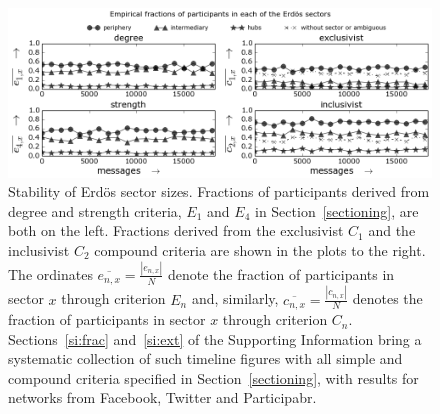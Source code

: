 \documentclass[%
	aip,
	jmp,%
	amsmath,amssymb,
	reprint,%
]{revtex4-1}
\begin{document}
																																																																																		\begin{figure} 
																																																																																			\centering
																																																																																			\includegraphics[width=\textwidth]{figs/InText-WLAU-S1000_}
																																																																																			\caption{Stability of Erd\"os sector sizes.
																																																																																				Fractions of participants derived from degree and strength criteria, $E_1$ and $E_4$ in Section~\ref{sectioning}, are both on the left.
																																																																																				Fractions derived from the exclusivist $C_1$ and the inclusivist $C_2$ compound criteria are shown in the plots to the right.
																																																																																				The ordinates $\overline{e_{n,x}}=\frac{|e_{n,x}|}{N}$ denote the fraction of participants in sector $x$ through criterion $E_n$
																																																																																				and, similarly, $\overline{c_{n,x}}=\frac{|c_{n,x}|}{N}$ denotes the fraction of participants in sector $x$ through criterion $C_n$.
																																																																																			Sections~\ref{si:frac} and~\ref{si:ext} of the Supporting Information bring a systematic collection of such timeline figures with all simple and compound criteria specified in Section~\ref{sectioning}, with results for networks from Facebook, Twitter and Participabr.}
																																																																																			\label{fig:sectIL}
																																																																																		\end{figure}
\end{document}
